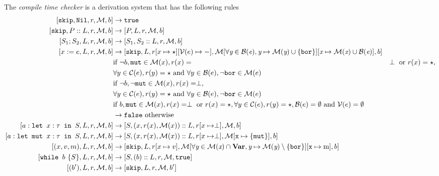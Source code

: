 \begin{definition}
\label{compiletimecheckerwhile}
The \emph{compile time checker} is a derivation system that has the following rules
\begin{align*}
\ccwhile{\texttt{skip}}{\texttt{Nil}}{r}{M}{b} & \to \texttt{true}  \\
\ccwhile{\texttt{skip}}{P::L}{r}{M}{b}      & \to \ccwhile{P}{L}{r}{M}{b}  \\
\ccwhile{S_1; S_2}{L}{r}{M}{b}                 & \to \ccwhile{S_1}{S_2::L}{r}{M}{b}  \\
\ccwhile{x:=e}{L}{r}{M}{b}                    & \to \ccwhile{\texttt{skip}}{L}{r[x\mapsto \star][\mathcal{V}(e) \mapsto -]}{M[\forall \textit{y} \in B(\textit{e}), \textit{y}\mapsto M(\textit{y})\cup \{\texttt{bor} \} ][\textit{x} \mapsto M(\textit{x}) \cup B(\textit{e})]}{b} \\
                                    & \textrm{if } \neg b, \texttt{mut} \in \mathcal{M}(x), r(x) = & \perp \textrm{ or } r(x) = \star, \\ &  \forall y \in \mathcal{C}(e), r(y) = \star \textrm{ and } \forall y \in \mathcal{B}(e), \neg \texttt{bor} \in \mathcal{M}(e) \\
                                    & \textrm{if } \neg b, \neg \texttt{mut} \in \mathcal{M}(x),  r(x) = \perp,  \\ & \forall y \in \mathcal{C}(e), r(y) = \star \textrm{ and } \forall y \in \mathcal{B}(e), \neg \texttt{bor} \in \mathcal{M}(e) \\
                                    & \textrm{if } b, \texttt{mut} \in \mathcal{M}(x), r(x) = \perp \textrm{ or } r(x) = \star, \forall y \in \mathcal{C}(e), r(y) = \star, \mathcal{B}(e) = \emptyset \textrm{ and } \mathcal{V}(e) = \emptyset \\
                                    & \to \texttt{false} \textrm{ otherwise}\\
\ccwhile{\letm{x}{S}}{L}{r}{M}{b} & \to \ccwhile{S}{(x,r(x),\mathcal{M}(x))::L}{r[x\mapsto \perp]}{M}{b} \\
\ccwhile{\letmut{x}{S}}{L}{r}{M}{b} & \to \ccwhile{S}{(x,r(x),\mathcal{M}(x))::L}{r[x\mapsto \perp]}{M[\texttt{x}\mapsto\{\texttt{mut}\}]}{b} \\
\ccwhile{(x,v,m)}{L}{r}{M}{b}                    & \to \ccwhile{\texttt{skip}}{L}{r[x \mapsto v]}{M[\forall \textit{y} \in M(\textit{x})\cap\textbf{Var}, \textit{y} \mapsto M(\textit{y}) \setminus \{\texttt{bor}\}][\texttt{x} \mapsto \textrm{m}]}{b} \\
\ccwhile{\whi{S}}{L}{r}{M}{b} & \to \ccwhile{S}{(b)::L}{r}{M}{\texttt{true}} \\
\ccwhile{(b')}{L}{r}{M}{b} & \to \ccwhile{\texttt{skip}}{L}{r}{M}{b'}
\end{align*}
\end{definition}

